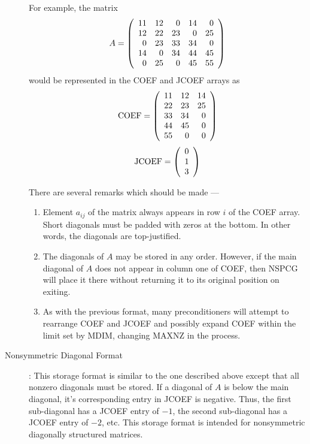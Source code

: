 \begin{description}
  For example, the matrix
  \[
     A = \left( \begin{array}{rrrrr}
                 11 & 12 &  0 & 14 &  0 \\
                 12 & 22 & 23 &  0 & 25 \\
                  0 & 23 & 33 & 34 &  0 \\
                 14 &  0 & 34 & 44 & 45 \\
                  0 & 25 &  0 & 45 & 55
        \end{array} \right)
  \]
  would be represented in the COEF and JCOEF arrays as
  \[
     \mbox{COEF} = \left( \begin{array}{rrr}
            11 & 12 & 14 \\
            22 & 23 & 25 \\
            33 & 34 &  0 \\
            44 & 45 &  0 \\
            55 &  0 &  0
      \end{array} \right)
  \]
  \[
     \mbox{JCOEF} = \left( \begin{array}{r}
             0 \\
             1 \\
             3
      \end{array} \right)
  \]
 
  There are several remarks which should be made ---
  \begin{enumerate}
  \item
       Element $a_{ij}$ of the matrix always appears in row $i$
       of the COEF array.  Short diagonals must be padded with
       zeros at the bottom.  In other words, the diagonals are
       top-justified.
  \item
       The diagonals of $A$ may be stored in any order.  However,
       if the main diagonal of $A$ does not appear in column one
       of COEF, then NSPCG will place it there without returning
       it to its original position on exiting.
  \item
       As with the previous format, many preconditioners will
       attempt to rearrange COEF and JCOEF and possibly expand
       COEF within the limit set by MDIM, changing MAXNZ in the
       process.
  \end{enumerate}
 
\newpage
\item[Nonsymmetric Diagonal Format]:
  This storage format is similar to the one described above
  except that all nonzero diagonals must be stored.  If a diagonal
  of $A$ is below the main diagonal, it's corresponding entry in JCOEF
  is negative.  Thus, the first sub-diagonal has a JCOEF entry of
  $-1$, the second sub-diagonal has a JCOEF entry of $-2$, etc.  This
  storage format is intended for nonsymmetric diagonally structured
  matrices.
 

\end{description}

